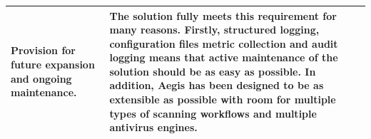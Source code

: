 \documentclass[12pt, conference, final, a4paper, onecolumn, compsoc]{IEEEtran}
\begin{document}
\begin{table}[H]
\begin{tabular}{|p{}|p{}|}
    Provision for future expansion and ongoing maintenance. & The solution fully
                                                             meets this
                                                             requirement for
                                                             many reasons.
                                                             Firstly, structured
                                                             logging,
                                                             configuration files
                                                             metric collection
                                                             and audit logging
                                                             means that
                                                             active maintenance
                                                             of the solution
                                                             should be as easy
                                                             as possible. In
                                                             addition, Aegis has
                                                             been designed to be
                                                             as extensible as
                                                             possible with room
                                                             for multiple types
                                                             of scanning
                                                             workflows and
                                                             multiple antivirus engines.
                                                              \\ \hline \hline


\end{tabular}
\end{table}
\end{document}
